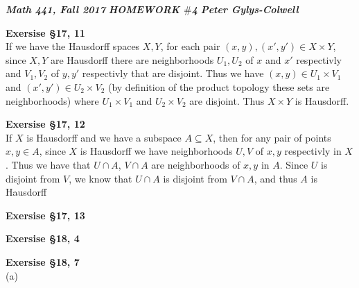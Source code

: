 \documentclass[12pt]{article}
\newenvironment{ques}[1]{\textbf{Exersise #1}\vspace{1 mm}\\ }{\bigskip}
\theoremstyle{definition}
\begin{document}
\noindent \textit{\textbf{Math 441, Fall 2017}} \hspace{1.3cm}
\textit{\textbf{HOMEWORK $\#$4}} \hspace{1.3cm} \textit{\textbf{Peter
Gylys-Colwell}} 

\vspace{1cm}

\begin{ques}{\S 17, 11}
	If we have the Hausdorff spaces $X, Y$, for each pair $(x,y), (x',y') \in X \times
	Y$, since $X, Y$ are Hausdorff there are neighborhoods $U_1, U_2$ of $x$
	and $x'$ respectivly and $V_1, V_2$ of $y, y'$ respectivly that are
	disjoint. Thus we have $(x, y) \in U_1 \times V_1$ and $(x', y') \in U_2
	\times V_2$ (by definition of the product topology these sets are
	neighborhoods) where $U_1 \times V_1$ and $U_2 \times V_2$ are disjoint.
	Thus $X \times Y$ is Hausdorff.
\end{ques}

\begin{ques}{\S 17, 12}
	If $X$ is Hausdorff and we have a subspace $A \subseteq X$, then for any
	pair of points $x, y \in A$, since $X$ is Hausdorff we have neighborhoods
	$U, V$ of $x, y$ respectivly in $X$. Thus we have that $U \cap A$, $V \cap
	A$ are neighborhoods of $x, y$ in $A$. Since $U$ is disjoint from $V$, we
	know that $U \cap A$ is disjoint from $V \cap A$, and thus $A$ is Hausdorff
\end{ques}

\begin{ques}{\S 17, 13}
	
\end{ques}

\begin{ques}{\S 18, 4}
	
\end{ques}

\begin{ques}{\S 18, 7}
	(a) \ 
	
\end{ques}
\end{document}
